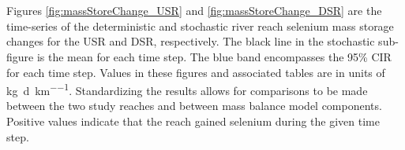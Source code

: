 \begin{linenumbers}
\subtabletop
\begin{table}[htbp]
	\centering
	\caption[DSR river segment deterministic and stochastic dissolved selenium mass storage change results tables.]{DSR river segment deterministic and stochastic dissolved selenium mass storage change results tables.  Values are in units of \si{\kilo\gram\per\day\per\kilo\meter}.}
	\label{tab:massSegmentStoreChange_DSR}
	\begin{subtable}{\textwidth}
		\centering
		
	\end{subtable}\\
	\tablevspace
	\begin{subtable}{\textwidth}
		\centering
		
	\end{subtable}\\
\end{table}

\clearpage{}


Figures \ref{fig:massStoreChange_USR} and \ref{fig:massStoreChange_DSR} are the time-series of the deterministic and stochastic river reach selenium mass storage changes for the USR and DSR, respectively.  The black line in the stochastic sub-figure is the mean for each time step.  The blue band encompasses the 95\% CIR for each time step.  Values in these figures and associated tables are in units of \si{\kilo\gram\per\day\per\kilo\meter}.  Standardizing the results allows for comparisons to be made between the two study reaches and between mass balance model components.  Positive values indicate that the reach gained selenium during the given time step.


\end{linenumbers}
